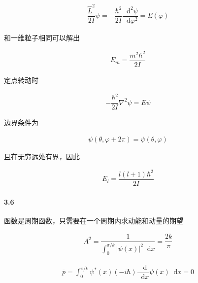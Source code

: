 \documentclass{article}
\newcommand*{\md}{\mathop{}\!\mathrm{d}}
\begin{document}
\begin{equation*}
  \begin{aligned}
    \dfrac{\hat{L}^2}{2I} \psi = - \dfrac{\hbar^2}{2 I} \dfrac{\md^2 \psi}{\md \varphi^2} = E \left( \varphi \right)  
  \end{aligned}
\end{equation*}

和一维粒子相同可以解出

\begin{equation*}
  \begin{aligned}
    E_m = \dfrac{m^2 \hbar^2}{2I} 
  \end{aligned}
\end{equation*}

定点转动时

\begin{equation*}
  \begin{aligned}
    - \dfrac{\hbar^2}{2I} \nabla^2 \psi = E \psi 
  \end{aligned}
\end{equation*}

边界条件为

\begin{equation*}
  \begin{aligned}
    \psi \left( \theta, \varphi + 2\pi \right) = \psi \left( \theta, \varphi \right)
  \end{aligned}
\end{equation*}

且在无穷远处有界，因此

\begin{equation*}
  \begin{aligned}
    E_l = \dfrac{l \left( l+1 \right) \hbar^2}{2I} 
  \end{aligned}
\end{equation*}

\paragraph{3.6}

函数是周期函数，只需要在一个周期内求动能和动量的期望

\begin{equation*}
  \begin{aligned}
    A^2 = \dfrac{1}{\int_0^{\pi/k} \left| \psi \left( x \right) \right|^2 \md x} = \dfrac{2k}{\pi} 
  \end{aligned}
\end{equation*}

\begin{equation*}
  \begin{aligned}
    \overline{p} = \int_0^{\pi/k} \psi^{*} \left( x \right) \left( - i \hbar \right) \dfrac{\md}{\md x} \psi \left( x \right) \md x = 0    
  \end{aligned}
\end{equation*}
\end{document}
